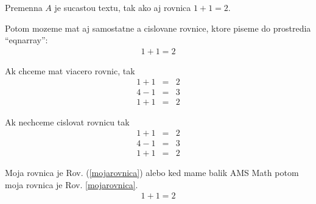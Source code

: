\documentclass{book}
\begin{document}
Premenna $A$ je sucastou textu, tak ako aj rovnica $1+1=2$.

Potom mozeme mat aj samostatne a cislovane rovnice, ktore piseme do prostredia ``eqnarray'':
\begin{eqnarray}
1+1=2
\end{eqnarray}

Ak chceme mat viacero rovnic, tak
\begin{eqnarray}
1+1&=&2\\
4-1&=&3\\
1+1&=&2
\end{eqnarray}

Ak nechceme cislovat rovnicu tak
\begin{eqnarray}
1+1&=&2\\
\nonumber
4-1&=&3\\
1+1&=&2
\end{eqnarray}

Moja rovnica je Rov. (\ref{mojarovnica}) alebo ked mame balik AMS Math potom moja rovnica je Rov. \eqref{mojarovnica}.
\begin{eqnarray}
\label{mojarovnica}
1+1=2
\end{eqnarray}
\end{document}
